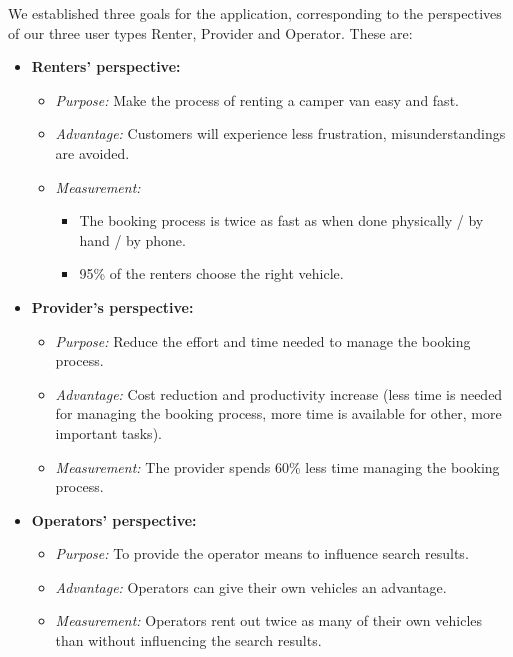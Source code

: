 We established three goals for the application, corresponding to the perspectives of our three user types Renter, Provider and Operator. These are:

\begin{itemize}
    \item \textbf{Renters’ perspective:}
    \begin{itemize}
        \item \textit{Purpose:} Make the process of renting a camper van easy and fast.
        \item \textit{Advantage:} Customers will experience less frustration, misunderstandings are avoided.
        \item \textit{Measurement:}
        \begin{itemize}
            \item The booking process is twice as fast as when done physically / by hand / by phone.
            \item 95\% of the renters choose the right vehicle.
        \end{itemize}
    \end{itemize}
    \item \textbf{Provider’s perspective:}
    \begin{itemize}
        \item \textit{Purpose:} Reduce the effort and time needed to manage the booking process.
        \item \textit{Advantage:} Cost reduction and productivity increase (less time is needed for managing the booking process, more time is available for other, more important tasks).
        \item \textit{Measurement:} The provider spends 60\% less time managing the booking process.
    \end{itemize}
    \item \textbf{Operators’ perspective:}
    \begin{itemize}
        \item \textit{Purpose:} To provide the operator means to influence search results.
        \item \textit{Advantage:} Operators can give their own vehicles an advantage.
        \item \textit{Measurement:} Operators rent out twice as many of their own vehicles than without influencing the search results.
    \end{itemize}
\end{itemize}
\clearpage
